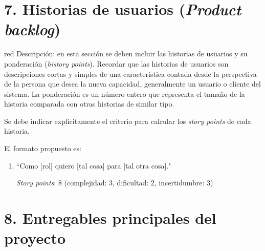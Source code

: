 \documentclass[
11pt, %
]{charter}
\begin{document}
\section{7. Historias de usuarios (\textit{Product backlog})}
\label{sec:backlog}

\begin{consigna}{red}
Descripción: en esta sección se deben incluir las historias de usuarios y su ponderación (\textit{history points}). Recordar que las historias de usuarios son descripciones cortas y simples de una característica contada desde la perspectiva de la persona que desea la nueva capacidad, generalmente un usuario o cliente del sistema. La ponderación es un número entero que representa el tamaño de la historia comparada con otras historias de similar tipo.

Se debe indicar explícitamente el criterio para calcular los \textit{story points} de cada historia.

El formato propuesto es: 
\begin{enumerate}
\item ``Como [rol] quiero [tal cosa] para [tal otra cosa]."

\textit{Story points}: 8 (complejidad: 3, dificultad: 2, incertidumbre: 3)
\end{enumerate}
\end{consigna}

\section{8. Entregables principales del proyecto}
\label{sec:entregables}
\end{document}
